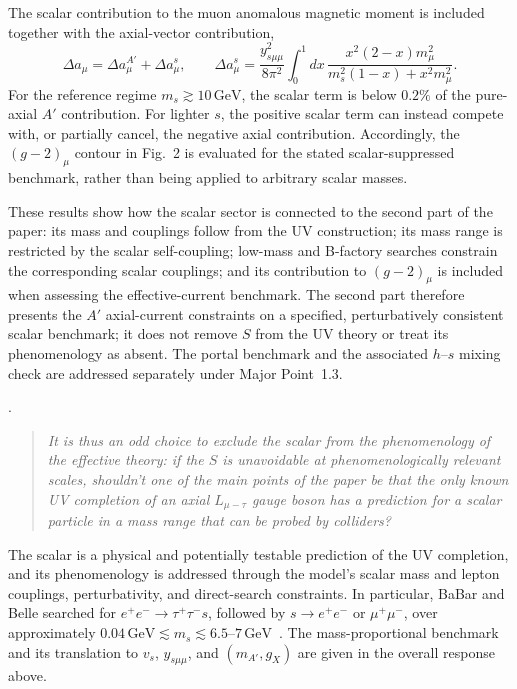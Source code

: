 \documentclass[12pt,a4paper]{article}
\begin{document}
The scalar contribution to the muon anomalous magnetic moment is included together with the axial-vector contribution,
\[
\Delta a_\mu=\Delta a_\mu^{A'}+\Delta a_\mu^s,
\qquad
\Delta a_\mu^s=
\frac{y_{s\mu\mu}^2}{8\pi^2}
\int_0^1 dx\,
\frac{x^2(2-x)m_\mu^2}
{m_s^2(1-x)+x^2m_\mu^2}.
\]
For the reference regime \(m_s\gtrsim10\,\mathrm{GeV}\), the scalar term is below \(0.2\%\) of the pure-axial \(A'\) contribution. For lighter \(s\), the positive scalar term can instead compete with, or partially cancel, the negative axial contribution. Accordingly, the \((g-2)_\mu\) contour in Fig.~2 is evaluated for the stated scalar-suppressed benchmark, rather than being applied to arbitrary scalar masses.

These results show how the scalar sector is connected to the second part of the paper: its mass and couplings follow from the UV construction; its mass range is restricted by the scalar self-coupling; low-mass and B-factory searches constrain the corresponding scalar couplings; and its contribution to \((g-2)_\mu\) is included when assessing the effective-current benchmark. The second part therefore presents the \(A'\) axial-current constraints on a specified, perturbatively consistent scalar benchmark; it does not remove \(S\) from the UV theory or treat its phenomenology as absent. The portal benchmark and the associated \(h\)--\(s\) mixing check are addressed separately under Major Point~1.3.


\medskip
{}
. \begin{quote}\itshape
It is thus an odd choice to exclude the scalar from the phenomenology of the effective theory: if the \(S\) is unavoidable at phenomenologically relevant scales, shouldn't one of the main points of the paper be that the only known UV completion of an axial \(L_{\mu-\tau}\) gauge boson has a prediction for a scalar particle in a mass range that can be probed by colliders?\end{quote}

The scalar is a physical and potentially testable prediction of the UV completion, and its phenomenology is addressed through the model's scalar mass and lepton couplings, perturbativity, and direct-search constraints. In particular, BaBar and Belle searched for \(e^+e^-\to\tau^+\tau^-s\), followed by \(s\to e^+e^-\) or \(\mu^+\mu^-\), over approximately \(0.04\,\mathrm{GeV}\lesssim m_s\lesssim6.5\text{--}7\,\mathrm{GeV}\)~\cite{BaBar:2020jma,Belle:2022gbl}. The mass-proportional benchmark and its translation to \(v_s\), \(y_{s\mu\mu}\), and \((m_{A'},g_X)\) are given in the overall response above.
\end{document}
